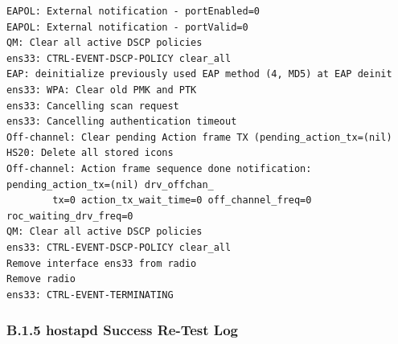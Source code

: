 \documentclass[11pt]{article}
\begin{document}
\begin{verbatim}
EAPOL: External notification - portEnabled=0
EAPOL: External notification - portValid=0
QM: Clear all active DSCP policies
ens33: CTRL-EVENT-DSCP-POLICY clear_all
EAP: deinitialize previously used EAP method (4, MD5) at EAP deinit
ens33: WPA: Clear old PMK and PTK
ens33: Cancelling scan request
ens33: Cancelling authentication timeout
Off-channel: Clear pending Action frame TX (pending_action_tx=(nil)
HS20: Delete all stored icons
Off-channel: Action frame sequence done notification: pending_action_tx=(nil) drv_offchan_
        tx=0 action_tx_wait_time=0 off_channel_freq=0 roc_waiting_drv_freq=0
QM: Clear all active DSCP policies
ens33: CTRL-EVENT-DSCP-POLICY clear_all
Remove interface ens33 from radio 
Remove radio 
ens33: CTRL-EVENT-TERMINATING 
\end{verbatim}


\subsubsection{B.1.5 hostapd Success Re-Test Log}
\label{sec:appendix-b-hostapd-success-retest-log}
\end{document}
